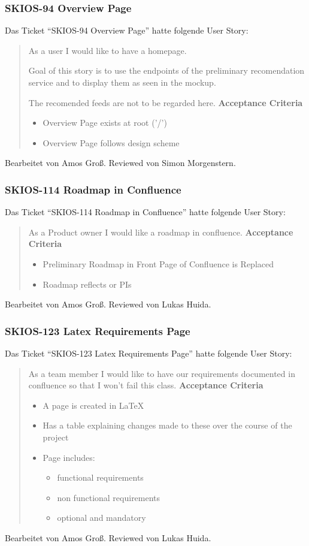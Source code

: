 \subsubsection{SKIOS-94 Overview Page}
Das Ticket \enquote{SKIOS-94 Overview Page} hatte folgende User Story:
\begin{quotation}
    As a user I would like to have a homepage.

    Goal of this story is to use the endpoints of the preliminary recomendation service and to display them as seen in the mockup.

    The recomended feeds are not to be regarded here.
\textbf{Acceptance Criteria}
\begin{itemize}
    \item Overview Page exists at root ('/')
    \item Overview Page follows design scheme 
\end{itemize}
\end{quotation}
Bearbeitet von Amos Groß.
Reviewed von Simon Morgenstern.

\subsubsection{SKIOS-114 Roadmap in Confluence}
Das Ticket \enquote{SKIOS-114 Roadmap in Confluence} hatte folgende User Story:
\begin{quotation}
    As a Product owner I would like a roadmap in confluence.
\textbf{Acceptance Criteria}
\begin{itemize}
    \item Preliminary Roadmap in Front Page of Confluence is Replaced
    \item Roadmap reflects or PIs
\end{itemize}
\end{quotation}
Bearbeitet von Amos Groß.
Reviewed von Lukas Huida.

\subsubsection{SKIOS-123 Latex Requirements Page}
Das Ticket \enquote{SKIOS-123 Latex Requirements Page} hatte folgende User Story:
\begin{quotation}
    As a team member I would like to have our requirements documented in confluence so that I won’t fail this class.
\textbf{Acceptance Criteria}
\begin{itemize}
    \item A page is created in LaTeX
    \item Has a table explaining changes made to these over the course of the project
    \item Page includes:
    \begin{itemize}
    \item functional requirements
    \item non functional requirements 
    \item optional and mandatory
    \end{itemize}
\end{itemize}
\end{quotation}
Bearbeitet von Amos Groß.
Reviewed von Lukas Huida.

